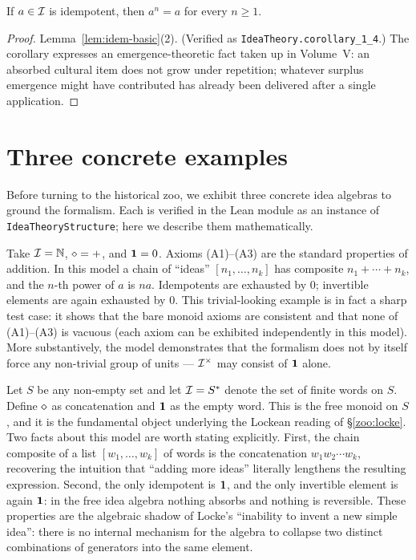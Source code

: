 \begin{corollary}\label{cor:1-4}
If $a \in \mathcal{I}$ is idempotent, then $a^n = a$ for every $n \ge 1$.
\end{corollary}

\begin{proof}
Lemma~\ref{lem:idem-basic}(2).  (Verified as
\texttt{IdeaTheory.corollary\_1\_4}.)  The corollary expresses an
emergence-theoretic fact taken up in Volume~V: an absorbed cultural item
does not grow under repetition; whatever surplus emergence might have
contributed has already been delivered after a single application.
\end{proof}

\section{Three concrete examples}\label{sec:examples}

Before turning to the historical zoo, we exhibit three concrete idea
algebras to ground the formalism.  Each is verified in the Lean module as
an instance of \texttt{IdeaTheoryStructure}; here we describe them
mathematically.

\begin{example}\label{ex:nat}
Take $\mathcal{I} = \mathbb{N}$, $\mathbin{\diamond} = +$, and $\mathbf{1} = 0$.  Axioms (A1)--(A3)
are the standard properties of addition.  In this model a chain of
``ideas'' $[n_1, \dots, n_k]$ has composite $n_1 + \cdots + n_k$, and the
$n$-th power of $a$ is $na$.  Idempotents are exhausted by $0$;
invertible elements are again exhausted by $0$.  This trivial-looking
example is in fact a sharp test case: it shows that the bare monoid axioms
are consistent and that none of (A1)--(A3) is vacuous (each axiom can be
exhibited independently in this model).  More substantively, the model
demonstrates that the formalism does not by itself force any non-trivial
group of units --- $\mathcal{I}^{\times}$ may consist of $\mathbf{1}$ alone.
\end{example}

\begin{example}\label{ex:free}
Let $S$ be any non-empty set and let $\mathcal{I} = S^{*}$ denote the set of
finite words on $S$.  Define $\mathbin{\diamond}$ as concatenation and $\mathbf{1}$ as
the empty word.  This is the free monoid on $S$, and it is the
fundamental object underlying the Lockean reading of
\S\ref{zoo:locke}.  Two facts about this model are worth stating
explicitly.  First, the chain composite of a list $[w_1, \dots, w_k]$ of
words is the concatenation $w_1 w_2 \cdots w_k$, recovering the intuition
that ``adding more ideas'' literally lengthens the resulting expression.
Second, the only idempotent is $\mathbf{1}$, and the only invertible element
is again $\mathbf{1}$: in the free idea algebra nothing absorbs and nothing is
reversible.  These properties are the algebraic shadow of Locke's
``inability to invent a new simple idea'': there is no internal mechanism
for the algebra to collapse two distinct combinations of generators into
the same element.
\end{example}


